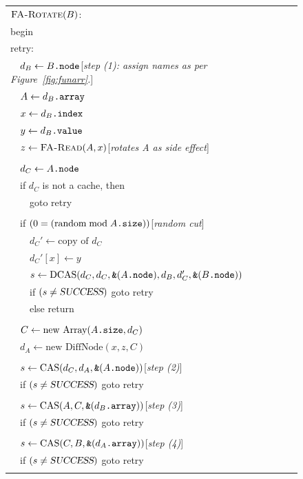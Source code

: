 \begin{figure}\centering%
\sis%
\renewcommand{\>}{~~}%
\newcommand{\com}[1]{\hfill [{\sl #1}]}%
\begin{tabular}{l}%
$\text{\sc FA-Rotate}(B)$:\\
begin\\
retry:\\
\>$d_B \gets B\text{\tt .node}$\com{step (1): assign names as per Figure~\ref{fig:funarr}.}\\
\>$A \gets d_B\text{\tt .array}$\\
\>$x \gets d_B\text{\tt .index}$\\
\>$y \gets d_B\text{\tt .value}$\\
\>$z \gets \text{\sc FA-Read}(A, x)$\com{rotates A as side effect}\\
\\
\>$d_C \gets A\text{\tt .node}$\\
\>if $d_C$ is not a cache, then \\
\>\>goto retry\\
\\
\>if $(0 = (\text{random} \bmod A\text{\tt .size}))$\com{random cut}\\
\>\>$d_C' \gets \text{copy of }d_C$\\
\>\>$d_C'[x] \gets y$\\
\>\>$s\gets\text{DCAS}(d_C, d_C, \text{\tt \&}(A\text{\tt .node}), d_B, d_C', \text{\tt \&}(B\text{\tt .node}))$\\
\>\>if $(s \neq \text{\sl SUCCESS})$ goto retry\\
\>\>else return\\
\\
\>$C \gets \text{new Array}(A\text{\tt .size}, d_C)$\\
\>$d_A \gets \text{new DiffNode}(x, z, C)$\\
\\
\>$s \gets \text{CAS}(d_C, d_A, \text{\tt \&}(A\text{\tt .node}))$\com{step (2)}\\
\>if $(s\neq \text{\sl SUCCESS})$ goto retry\\
\\
\>$s\gets\text{CAS}(A, C, \text{\tt \&}(d_B\text{\tt .array}))$\com{step (3)}\\
\>if $(s\neq \text{\sl SUCCESS})$ goto retry\\
\\
\>$s \gets\text{CAS}(C, B, \text{\tt \&}(d_A\text{\tt .array}))$\com{step (4)}\\
\>if $(s\neq \text{\sl SUCCESS})$ goto retry\\
\\

\end{tabular}
\end{figure}
